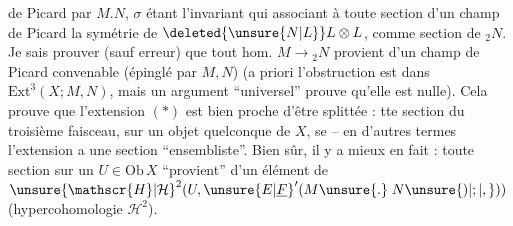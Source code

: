 \margin{\mbox{-- --}}

 de Picard  par $M.N$, $\sigma$ étant l'invariant qui  associant à toute section  d'un champ de Picard la symétrie de $\deleted{\unsure{N|L}}L\otimes L$,  comme section de ${}_{2}N$. Je sais prouver (sauf erreur) que tout hom. $M\to{}_{2}N$ provient d'un champ de Picard convenable (épinglé par $M,N$) (a priori l'obstruction est dans $\mathrm{Ext}^{3}(X;M,N)$, mais un argument ``universel'' prouve qu'elle est nulle). Cela prouve que l'extension $(*)$ est bien proche d'être splittée :  tte section du troisième faisceau, sur un objet quelconque de $X$, se  -- en d'autres termes l'extension a une section ``ensembliste''. Bien sûr, il y a mieux en fait : toute section sur un $U\in\mathrm{Ob}\,X$ ``provient'' d'un élément de ${\unsure{\mathscr{H}|\mathcal{H}}}^{2}(U,{\unsure{E|\underline{F}}}'(M\unsure{.}\;N\unsure{)|;|,}))$ (hypercohomologie $\mathscr{H}^{2}$).

